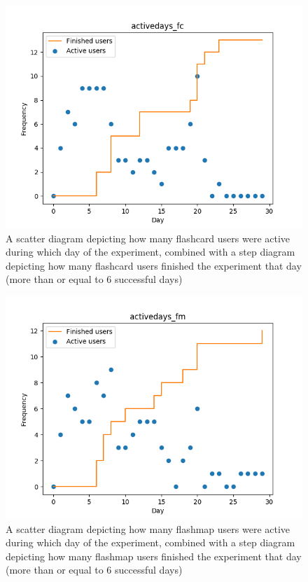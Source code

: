 \begin{figure}
    \centering
    \includegraphics[width=.7\textwidth]{img/activedays_fc.png}
    \caption{A scatter diagram depicting how many flashcard users were active during which day of the experiment, combined with a step diagram depicting how many flashcard users finished the experiment that day (more than or equal to 6 successful days)}
    \label{fig:activedays_fc}
\end{figure}
\begin{figure}
    \centering
    \includegraphics[width=.7\textwidth]{img/activedays_fm.png}
    \caption{A scatter diagram depicting how many flashmap users were active during which day of the experiment, combined with a step diagram depicting how many flashmap users finished the experiment that day (more than or equal to 6 successful days)}
    \label{fig:activedays_fm}
\end{figure}
